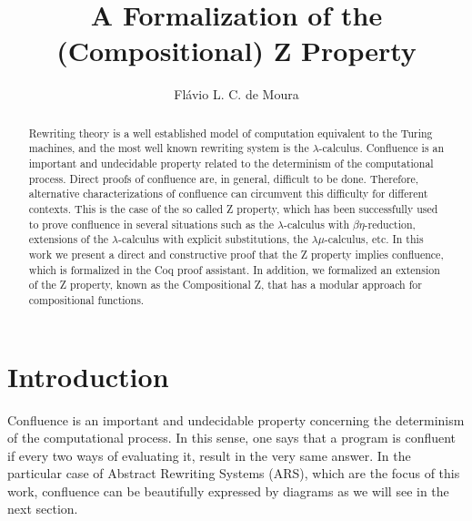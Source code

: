 \documentclass{llncs}
\title{A Formalization of the (Compositional) Z Property}
\author{Flávio L. C. de Moura}
\institute{Departamento de Ciência da Computação, Universidade de Brasília, Brazil\\
\email{flaviomoura@unb.br}}
\begin{document}
\maketitle
  
\begin{abstract}
  Rewriting theory is a well established model of computation equivalent to the Turing machines, and the most well known rewriting system is the $\lambda$-calculus. Confluence is an important and undecidable property related to the determinism of the computational process. Direct proofs of confluence are, in general, difficult to be done. Therefore, alternative characterizations of confluence can circumvent this difficulty for different contexts. This is the case of the so called Z property, which has been successfully used to prove confluence in several situations such as the  $\lambda$-calculus with $\beta\eta$-reduction, extensions of the $\lambda$-calculus with explicit substitutions, the $\lambda\mu$-calculus, etc. In this work we present a direct and constructive proof that the Z property implies confluence, which is formalized in the Coq proof assistant. In addition, we formalized an extension of the Z property, known as the Compositional Z, that has a modular approach for compositional functions.
\end{abstract}


\section{Introduction}

Confluence is an important and undecidable property concerning the determinism of the computational process. In this sense, one says that a program is confluent if every two ways of evaluating it, result in the very same answer. In the particular case of Abstract Rewriting Systems (ARS), which are the focus of this work, confluence can be beautifully expressed by diagrams as we will see in the next section.
\end{document}
